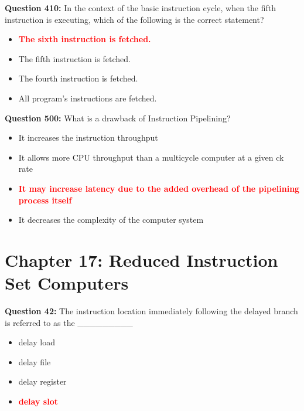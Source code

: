 \documentclass[12pt,a4paper]{article}
\begin{document}
\textbf{Question 410:} In the context of the basic instruction cycle, when the fifth instruction is executing, which of the following is the correct statement?

\begin{itemize}
    \item[\textbf{A.}] \textcolor{red}{\textbf{The sixth instruction is fetched.}}
    \item[\textbf{B.}] The fifth instruction is fetched.
    \item[\textbf{C.}] The fourth instruction is fetched.
    \item[\textbf{D.}] All program's instructions are fetched.
\end{itemize}

\vspace{0.5cm}

\textbf{Question 500:} What is a drawback of Instruction Pipelining?

\begin{itemize}
    \item[\textbf{A.}] It increases the instruction throughput
    \item[\textbf{B.}] It allows more CPU throughput than a multicycle computer at a given ck rate
    \item[\textbf{C.}] \textcolor{red}{\textbf{It may increase latency due to the added overhead of the pipelining process itself}}
    \item[\textbf{D.}] It decreases the complexity of the computer system
\end{itemize}

\vspace{0.5cm}

\section{Chapter 17: Reduced Instruction Set Computers}

\textbf{Question 42:} The instruction location immediately following the delayed branch is referred to as the _________

\begin{itemize}
    \item[\textbf{A.}] delay load
    \item[\textbf{B.}] delay file
    \item[\textbf{C.}] delay register
    \item[\textbf{D.}] \textcolor{red}{\textbf{delay slot}}
\end{itemize}
\end{document}
